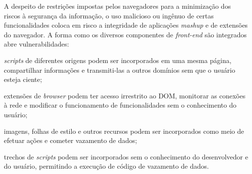 A despeito de restrições impostas pelos navegadores para a minimização dos riscos à segurança da informação, o uso malicioso ou ingênuo de certas funcionalidades coloca em risco a integridade de aplicações \textit{mashup} e de extensões do navegador. A forma como os diversos componentes de \textit{front-end} são integrados abre vulnerabilidades:

\begin{alineas}
	\item \textit{scripts} de diferentes origens podem ser incorporados em uma mesma página, compartilhar informações e transmiti-las a outros domínios sem que o usuário esteja ciente;
	\item extensões de \textit{browser} podem ter acesso irrestrito ao DOM, monitorar as conexões à rede e modificar o funcionamento de funcionalidades sem o conhecimento do usuário;
	\item imagens, folhas de estilo e outros recursos podem ser incorporados como meio de efetuar ações e cometer vazamento de dados;
	\item trechos de \textit{scripts} podem ser incorporados sem o conhecimento do desenvolvedor e do usuário, permitindo a execução de código de vazamento de dados.
\end{alineas}







